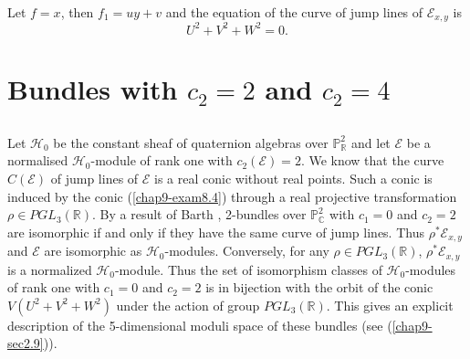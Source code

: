 \setcounter{subprop}{3}
\begin{subexam}\label{chap9-exam8.4}
Let $f=x$, then $f_{1}=uy+v$ and the equation of the curve of jump
lines of $\mathscr{E}_{x,y}$ is 
$$
U^{2}+V^{2}+W^{2}=0.
$$
\end{subexam}

\section{Bundles with \texorpdfstring{$c_{2}=2$}{c22} and \texorpdfstring{$c_{2}=4$}{c24}}\label{chap9-sec9}

\subsection{}\label{chap9-sec9.1}

Let $\mathscr{H}_{0}$ be the constant sheaf of quaternion algebras
over $\mathbb{P}^{2}_{\mathbb{R}}$ and let $\mathscr{E}$ be a
normalised $\mathscr{H}_{0}$-module of rank one with
$c_{2}(\mathscr{E})=2$. We know that the curve $C(\mathscr{E})$ of
jump lines of $\mathscr{E}$ is a real conic without real points. Such
a conic is induced by the conic (\ref{chap9-exam8.4}) through a real
projective transformation $\rho\in PGL_{3}(\mathbb{R})$. By a result
of Barth \cite{chap9-key1}, 2-bundles over
$\mathbb{P}^{2}_{\mathbb{C}}$ with $c_{1}=0$ and $c_{2}=2$ are
isomorphic if and only if they have the same curve of jump lines. Thus
$\rho^{*}\mathscr{E}_{x,y}$ and $\mathscr{E}$ are isomorphic as
$\mathscr{H}_{0}$-modules. Conversely, for any $\rho\in
PGL_{3}(\mathbb{R})$, $\rho^{*}\mathscr{E}_{x,y}$ is a normalized
$\mathscr{H}_{0}$-module. Thus the set of isomorphism classes of
$\mathscr{H}_{0}$-modules of rank one with $c_{1}=0$ and $c_{2}=2$ is
in bijection with the orbit of the conic $V(U^{2}+V^{2}+W^{2})$ under
the action of group $PGL_{3}(\mathbb{R})$. This gives an explicit
description of the 5-dimensional moduli space of these bundles (see
(\ref{chap9-sec2.9})). 

\subsection{}\label{chap9-sec9.2}

